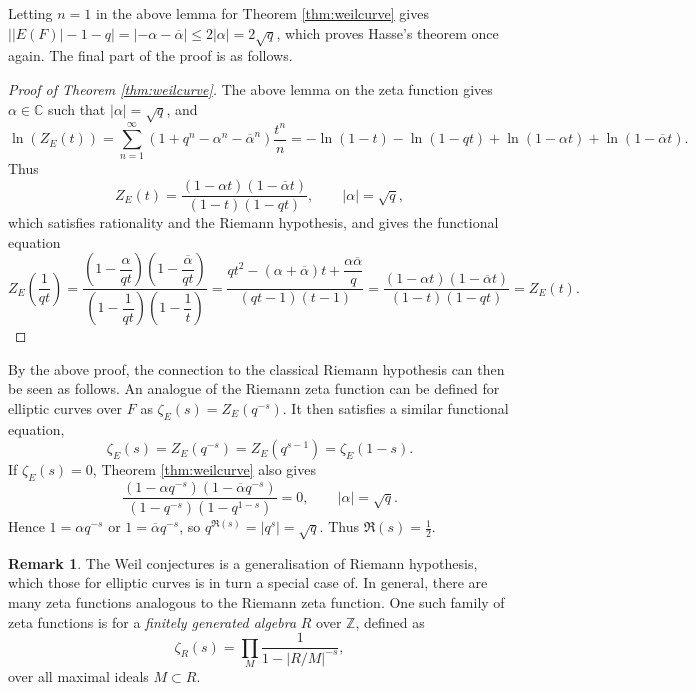 \documentclass{article}
\newcommand{\Z}{\mathbb{Z}}
\newcommand{\C}{\mathbb{C}}
\newcommand{\rb}[1]{\left( #1 \right)}
\newcommand{\abs}[1]{\left\lvert #1 \right\rvert}
\theoremstyle{definition}
\newtheorem*{remark}{Remark}
\begin{document}
Letting $ n = 1 $ in the above lemma for Theorem \ref{thm:weilcurve} gives $ \abs{\abs{E\rb{F}} - 1 - q} = \abs{-\alpha - \overline{\alpha}} \le 2\abs{\alpha} = 2\sqrt{q} $, which proves Hasse's theorem once again. The final part of the proof is as follows.

\begin{proof}[Proof of Theorem \ref{thm:weilcurve}]
The above lemma on the zeta function gives $ \alpha \in \C $ such that $ \abs{\alpha} = \sqrt{q} $, and
$$ \ln\rb{Z_E\rb{t}} = \sum_{n = 1}^\infty \rb{1 + q^n - \alpha^n - \overline{\alpha}^n}\dfrac{t^n}{n} = -\ln\rb{1 - t} - \ln\rb{1 - qt} + \ln\rb{1 - \alpha t} + \ln\rb{1 - \overline{\alpha} t}. $$
Thus
$$ Z_E\rb{t} = \dfrac{\rb{1 - \alpha t}\rb{1 - \overline{\alpha}t}}{\rb{1 - t}\rb{1 - qt}}, \qquad \abs{\alpha} = \sqrt{q}, $$
which satisfies rationality and the Riemann hypothesis, and gives the functional equation
$$ Z_E\rb{\dfrac{1}{qt}} = \dfrac{\rb{1 - \dfrac{\alpha}{qt}}\rb{1 - \dfrac{\overline{\alpha}}{qt}}}{\rb{1 - \dfrac{1}{qt}}\rb{1 - \dfrac{1}{t}}} = \dfrac{qt^2 - \rb{\alpha + \overline{\alpha}}t + \dfrac{\alpha\overline{\alpha}}{q}}{\rb{qt - 1}\rb{t - 1}} = \dfrac{\rb{1 - \alpha t}\rb{1 - \overline{\alpha}t}}{\rb{1 - t}\rb{1 - qt}} = Z_E\rb{t}. $$
\end{proof}

By the above proof, the connection to the classical Riemann hypothesis can then be seen as follows. An analogue of the Riemann zeta function can be defined for elliptic curves over $ F $ as $ \zeta_E\rb{s} = Z_E\rb{q^{-s}} $. It then satisfies a similar functional equation,
$$ \zeta_E\rb{s} = Z_E\rb{q^{-s}} = Z_E\rb{q^{s - 1}} = \zeta_E\rb{1 - s}. $$
If $ \zeta_E\rb{s} = 0 $, Theorem \ref{thm:weilcurve} also gives
$$ \dfrac{\rb{1 - \alpha q^{-s}}\rb{1 - \overline{\alpha}q^{-s}}}{\rb{1 - q^{-s}}\rb{1 - q^{1 - s}}} = 0, \qquad \abs{\alpha} = \sqrt{q}. $$
Hence $ 1 = \alpha q^{-s} $ or $ 1 = \overline{\alpha} q^{-s} $, so $ q^{\Re\rb{s}} = \abs{q^s} = \sqrt{q} $. Thus $ \Re\rb{s} = \tfrac{1}{2} $.

\begin{remark}
The Weil conjectures is a generalisation of Riemann hypothesis, which those for elliptic curves is in turn a special case of. In general, there are many zeta functions analogous to the Riemann zeta function. One such family of zeta functions is for a \emph{finitely generated algebra} $ R $ over $ \Z $, defined as
$$ \zeta_R\rb{s} = \prod_M \dfrac{1}{1 - \abs{R / M}^{-s}}, $$
over all maximal ideals $ M \subset R $.
\end{remark}
\end{document}

